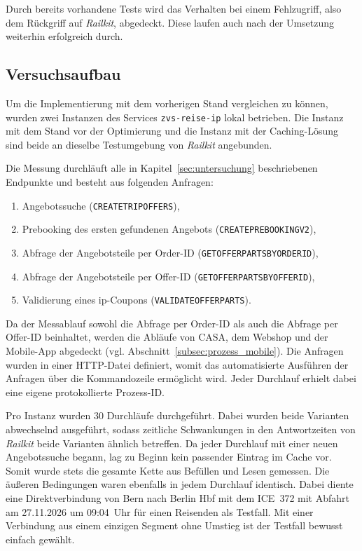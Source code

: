 Durch bereits vorhandene Tests wird das Verhalten bei einem Fehlzugriff, also dem Rückgriff auf \textit{Railkit}, abgedeckt. Diese laufen auch nach der Umsetzung weiterhin erfolgreich durch.

\subsection{Versuchsaufbau}
\label{subsec:versuchsaufbau}

Um die Implementierung mit dem vorherigen Stand vergleichen zu können, wurden zwei Instanzen des Services \texttt{zvs-reise-ip} lokal betrieben. Die Instanz mit dem Stand vor der Optimierung und die Instanz mit der Caching-Lösung sind beide an dieselbe Testumgebung von \textit{Railkit} angebunden.

Die Messung durchläuft alle in Kapitel~\ref{sec:untersuchung} beschriebenen Endpunkte und besteht aus folgenden Anfragen:

\begin{enumerate}
    \item Angebotssuche (\texttt{CREATETRIPOFFERS}),
    \item Prebooking des ersten gefundenen Angebots (\texttt{CREATEPREBOOKINGV2}),
    \item Abfrage der Angebotsteile per Order-ID (\texttt{GETOFFERPARTSBYORDERID}),
    \item Abfrage der Angebotsteile per Offer-ID (\texttt{GETOFFERPARTSBYOFFERID}),
    \item Validierung eines \ac{ip}-Coupons (\texttt{VALIDATEOFFERPARTS}).
\end{enumerate}

Da der Messablauf sowohl die Abfrage per Order-ID als auch die Abfrage per Offer-ID beinhaltet, werden die Abläufe von CASA, dem Webshop und der Mobile-App abgedeckt (vgl. Abschnitt~\ref{subsec:prozess_mobile}). Die Anfragen wurden in einer HTTP-Datei definiert, womit das automatisierte Ausführen der Anfragen über die Kommandozeile ermöglicht wird. Jeder Durchlauf erhielt dabei eine eigene protokollierte Prozess-ID.

Pro Instanz wurden 30 Durchläufe durchgeführt. Dabei wurden beide Varianten abwechselnd ausgeführt, sodass zeitliche Schwankungen in den Antwortzeiten von \textit{Railkit} beide Varianten ähnlich betreffen. Da jeder Durchlauf mit einer neuen Angebotssuche begann, lag zu Beginn kein passender Eintrag im Cache vor. Somit wurde stets die gesamte Kette aus Befüllen und Lesen gemessen. Die äußeren Bedingungen waren ebenfalls in jedem Durchlauf identisch. Dabei diente eine Direktverbindung von Bern nach Berlin Hbf mit dem ICE~372 mit Abfahrt am 27.11.2026 um 09:04~Uhr für einen Reisenden als Testfall. Mit einer Verbindung aus einem einzigen Segment ohne Umstieg ist der Testfall bewusst einfach gewählt.

